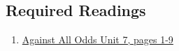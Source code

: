 \documentclass[letterpaper,9pt,twocolumn,twoside,printwatermark=false]{pinp}
\begin{document}
\subsection{Required Readings}\label{required-readings-2}

\begin{enumerate}
\item \href{https://www.learner.org/courses/againstallodds/pdfs/AgainstAllOdds_StudentGuide_Unit07.pdf#page=1}{Against All Odds Unit 7, pages 1-9}
\end{enumerate}





\end{document}
